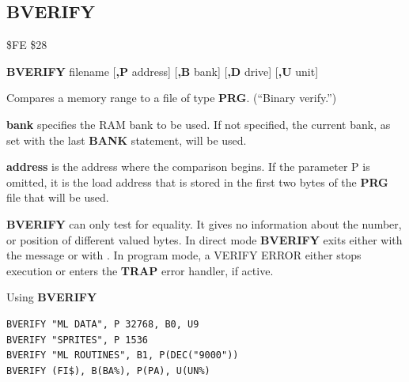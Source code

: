 
\newpage
\subsection{BVERIFY}
\begin{description}[leftmargin=2cm,style=nextline]
\item [Token:] \$FE \$28
\item [Format:] {\bf BVERIFY} filename [{\bf,P} address]
                [{\bf,B} bank] [{\bf,D} drive] [{\bf,U} unit]
\item [Usage:]
   Compares a memory range to
   a file of type {\bf PRG}. (``Binary verify.'')

   \filenamedefinition

   {\bf bank} specifies the RAM bank to be used.
   If not specified, the current bank, as set with the last
   {\bf BANK} statement, will be used.

   {\bf address} is the address where the comparison begins.
   If the parameter P is omitted, it is the load address
   that is stored in the first two bytes of the {\bf PRG} file that will be used.

   \drivedefinition

   \unitdefinition

\item [Remarks:]
   {\bf BVERIFY} can only test for equality. It gives no information
   about the number, or position of different valued bytes.
   In direct mode {\bf BVERIFY} exits either with the message 
   or with . In program mode, a VERIFY ERROR
   either stops execution or enters the {\bf TRAP} error handler,
   if active.

\item [Examples:] Using {\bf BVERIFY}
\begin{tcolorbox}[colback=black,coltext=white]
\verbatimfont{\codefont}
\begin{verbatim}
BVERIFY "ML DATA", P 32768, B0, U9
BVERIFY "SPRITES", P 1536
BVERIFY "ML ROUTINES", B1, P(DEC("9000"))
BVERIFY (FI$), B(BA%), P(PA), U(UN%)
\end{verbatim}
\end{tcolorbox}
\end{description}


\newpage
